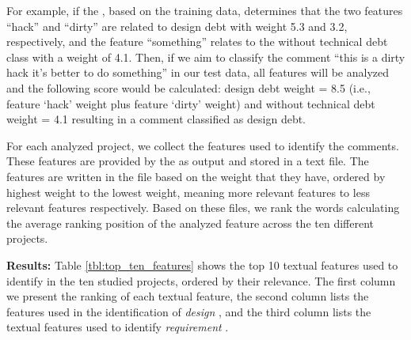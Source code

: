 For example, if the , based on the training data, determines that the two features ``hack'' and ``dirty'' are related to design debt with weight 5.3 and 3.2, respectively, and the feature ``something'' relates to the without technical debt class with a weight of 4.1. Then, if we aim to classify the comment ``this is a dirty hack it's better to do something'' in our test data, all features will be analyzed and the following score would be calculated: design debt weight = 8.5 (i.e., feature `hack' weight plus feature `dirty' weight) and without technical debt weight = 4.1 resulting in a comment classified as design debt.

For each analyzed project, we collect the features used to identify the \SATD comments. These features are provided by the  as output and stored in a text file. The features are written in the file based on the weight that they have, ordered by highest weight to the lowest weight, meaning more relevant features to less relevant features respectively. Based on these files, we rank the words calculating the average ranking position of the analyzed feature across the ten different projects. 

\noindent \textbf{Results:} Table \ref{tbl:top_ten_features} shows the top 10 textual features used to identify  \SATD in the ten studied projects, ordered by their relevance. The first column we present the ranking of each textual feature, the second column lists the features used in the identification of \emph{design} \SATD, and the third column lists the textual features used to identify \emph{requirement} \SATD.

